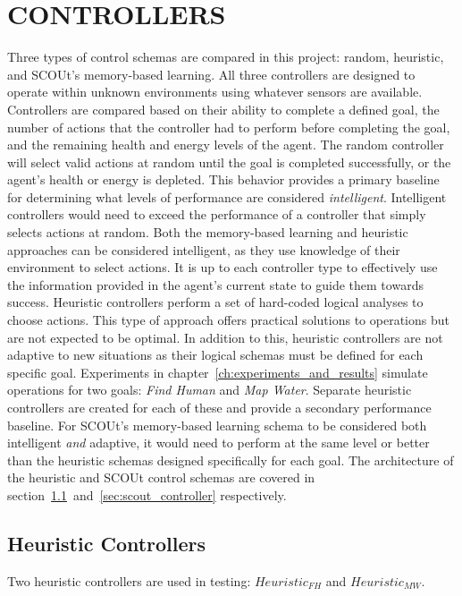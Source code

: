 
\chapter{CONTROLLERS} \label{ch:controllers}
Three types of control schemas are compared in this project: random, heuristic, and SCOUt's memory-based learning.
All three controllers are designed to operate within unknown environments using whatever sensors are available.
Controllers are compared based on their ability to complete a defined goal, the number of actions that the controller had to perform before completing the goal, and the remaining health and energy levels of the agent.
The random controller will select valid actions at random until the goal is completed successfully, or the agent's health or energy is depleted.
This behavior provides a primary baseline for determining what levels of performance are considered \textit{intelligent}.
Intelligent controllers would need to exceed the performance of a controller that simply selects actions at random.
Both the memory-based learning and heuristic approaches can be considered intelligent, as they use knowledge of their environment to select actions.
It is up to each controller type to effectively use the information provided in the agent's current state to guide them towards success.
Heuristic controllers perform a set of hard-coded logical analyses to choose actions.
This type of approach offers practical solutions to operations but are not expected to be optimal.
In addition to this, heuristic controllers are not adaptive to new situations as their logical schemas must be defined for each specific goal.
Experiments in chapter~\ref{ch:experiments_and_results} simulate operations for two goals: \textit{Find Human} and \textit{Map Water}.
Separate heuristic controllers are created for each of these and provide a secondary performance baseline.
For SCOUt's memory-based learning schema to be considered both intelligent \textit{and} adaptive, it would need to perform at the same level or better than the heuristic schemas designed specifically for each goal.
The architecture of the heuristic and SCOUt control schemas are covered in section~\ref{sec:heuristic_controllers}~and~\ref{sec:scout_controller} respectively.


\section{Heuristic Controllers} \label{sec:heuristic_controllers}
Two heuristic controllers are used in testing: $Heuristic_{FH}$ and $Heuristic_{MW}$.


